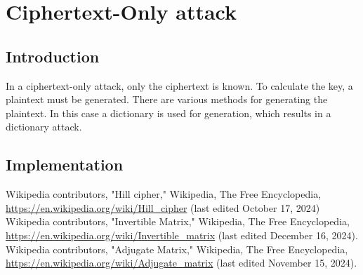 \documentclass[conference]{IEEEtran}
\begin{document}
\section{Ciphertext-Only attack}
\subsection{Introduction}
In a ciphertext-only attack, only the ciphertext is known. To calculate the key, a plaintext must be generated. There are various methods for generating the plaintext. In this case a dictionary is used for generation, which results in a dictionary attack.
\subsection{Implementation}

\begin{thebibliography}{9}
 Wikipedia contributors, "Hill cipher," Wikipedia, The Free Encyclopedia, \url{https://en.wikipedia.org/wiki/Hill_cipher} (last edited October 17, 2024)
 Wikipedia contributors, "Invertible Matrix," Wikipedia, The Free Encyclopedia, \url{https://en.wikipedia.org/wiki/Invertible_matrix} (last edited December 16, 2024).
  Wikipedia contributors, "Adjugate Matrix," Wikipedia, The Free Encyclopedia, \url{https://en.wikipedia.org/wiki/Adjugate_matrix} (last edited November 15, 2024).
\end{thebibliography}
\end{document}
